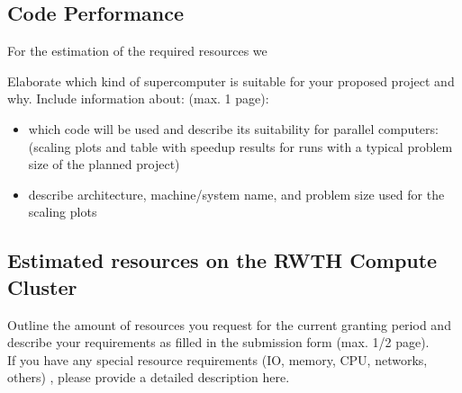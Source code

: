 \documentclass[12pt]{article}
\begin{document}
\subsection{Code Performance}
For the estimation of the required resources we


Elaborate which kind of supercomputer is suitable for your proposed project and why. Include information about: (max. 1 page):
\begin{itemize}
	\item which code will be used and describe its suitability for parallel computers: (scaling plots and table with speedup results for runs with a typical problem size of the planned project)
	\item describe architecture, machine/system name, and problem size used for the scaling plots
\end{itemize}

\subsection{Estimated resources on the RWTH Compute Cluster}
Outline the amount of resources you request for the current granting period and describe your requirements as filled in the submission form (max. 1/2 page).\\
If you have any special resource requirements (IO, memory, CPU, networks, others) , please provide a detailed description here.
\end{document}
